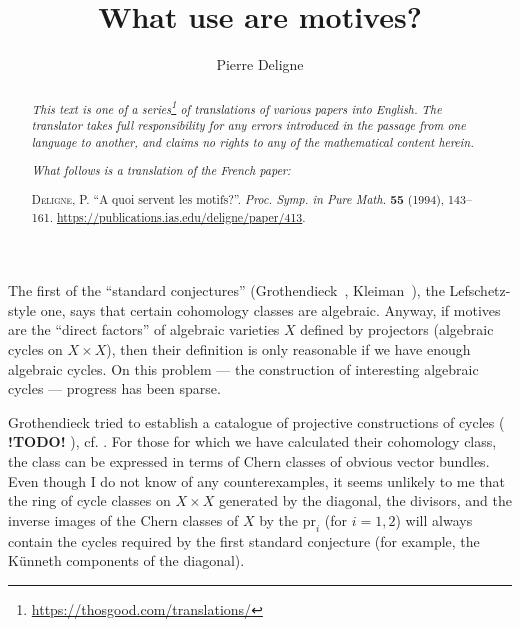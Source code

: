 \documentclass{article}
\title{What use are motives?}
\author{Pierre Deligne}
\date{}
\theoremstyle{plain}
\theoremstyle{definition}
\newcommand{\pr}{\mathrm{pr}}
\newcommand{\todo}{\textbf{ !TODO! }}
\newcommand{\oldpage}[1]{\marginpar{\footnotesize$\Big\vert$ \textit{p.~#1}}}
\begin{document}
\maketitle
\thispagestyle{fancy}

\renewcommand{\abstractname}{Translator's note.}

\begin{abstract}
  \renewcommand*{\thefootnote}{\fnsymbol{footnote}}
  \emph{This text is one of a series\footnote{\url{https://thosgood.com/translations/}} of translations of various papers into English.}
  \emph{The translator takes full responsibility for any errors introduced in the passage from one language to another, and claims no rights to any of the mathematical content herein.}
  
  \emph{What follows is a translation of the French paper:}

  \medskip\noindent
  \textsc{Deligne, P.}
  ``A quoi servent les motifs?''.
  \emph{Proc. Symp. in Pure Math.} \textbf{55} (1994), 143--161.
  {\footnotesize\url{https://publications.ias.edu/deligne/paper/413}}.
\end{abstract}

\setcounter{footnote}{0}

\setcounter{tocdepth}{1}
\tableofcontents
\bigskip



\oldpage{143}
The first of the ``standard conjectures'' (Grothendieck~\cite{19}, Kleiman~\cite{20}), the Lefschetz-style one, says that certain cohomology classes are algebraic.
Anyway, if motives are the ``direct factors'' of algebraic varieties $X$ defined by projectors (algebraic cycles on $X\times X$), then their definition is only reasonable if we have enough algebraic cycles.
On this problem --- the construction of interesting algebraic cycles --- progress has been sparse.

Grothendieck tried to establish a catalogue of projective constructions of cycles (\todo), cf. \cite[p.~197]{19}.
For those for which we have calculated their cohomology class, the class can be expressed in terms of Chern classes of obvious vector bundles.
Even though I do not know of any counterexamples, it seems unlikely to me that the ring of cycle classes on $X\times X$ generated by the diagonal, the divisors, and the inverse images of the Chern classes of $X$ by the $\pr_i$ (for $i=1,2$) will always contain the cycles required by the first standard conjecture (for example, the K\"{u}nneth components of the diagonal).
\end{document}
